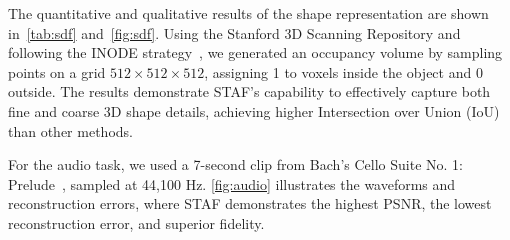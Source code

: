 The quantitative and qualitative results of the shape representation are shown in~\cref{tab:sdf} and~\cref{fig:sdf}. Using the Stanford 3D Scanning Repository and following the INODE strategy~\citep{kazerouni2024incode}, we generated an occupancy volume by sampling points on a grid \(512 \times 512 \times 512\), assigning 1 to voxels inside the object and 0 outside. The results demonstrate STAF's capability to effectively capture both fine and coarse 3D shape details, achieving higher Intersection over Union (IoU) than other methods.
\begin{table}[h]
    \centering
    \vspace{-0.5em}
    \caption{Quantitative comparisons of SDF representations.}
    \label{tab:sdf}
    \vspace{-0.5em}
\end{table}

For the audio task, we used a 7-second clip from Bach’s Cello Suite No. 1: Prelude~\citep{Siren}, sampled at 44,100 Hz. \cref{fig:audio} illustrates the waveforms and reconstruction errors, where STAF demonstrates the highest PSNR, the lowest reconstruction error, and superior fidelity.

